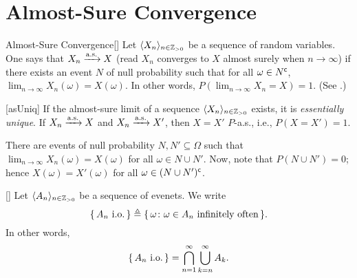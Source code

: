 \documentclass[../probability.tex]{subfiles}
\begin{document}
\section{Almost-Sure Convergence}

\begin{Definition}{Almost-Sure Convergence}[]
    Let \(\lang X_n \rang_{n \in \ZZ_{>0}}\) be a
    sequence of random variables.
    One says that \(X_n \xrightarrow{\mathrm{a.s.}} X\)
    (read \(X_n\) converges to \(X\) almost surely when \(n \to \infty\))
    if there exists an event \(N\) of null probability
    such that for all \(\omega \in N^{\mathsf{c}}\),
    \(\lim_{n \to \infty} X_n(\omega) = X(\omega)\).
    In other words, \(P \left( \lim_{n \to \infty} X_n = X \right) = 1\). (See .)
\end{Definition}

\begin{Lemma}{}[asUniq]
    If the almost-sure limit of a sequence \(\lang X_n \rang_{n \in \ZZ_{>0}}\)
    exists, it is \emph{essentially unique}.
    If \(X_n \xrightarrow{\mathrm{a.s.}} X\) and \(X_n \xrightarrow{\mathrm{a.s.}} X'\), then \(X = X'\) \(P\)-a.s., i.e., \(P(X = X') = 1\).
\end{Lemma}
\begin{myproof}[Proof]
    There are events of null probability \(N, N' \subseteq \Omega\)
    such that \(\lim_{n \to \infty} X_n(\omega) = X(\omega)\)
    for all \(\omega \in N \cup N'\).
    Now, note that \(P(N \cup N') = 0\);
    hence \(X(\omega) = X'(\omega)\) for all \(\omega \in (N \cup N')^{\mathsf{c}}\).
\end{myproof}

\begin{note}
\end{note}

\begin{Notation}{}[]
    Let \(\lang A_n \rang_{n \in \ZZ_{>0}}\) be a sequence of evenets.
    We write
    \[
        \{\,A_n\text{ i.o.}\,\} \triangleq \{\,\omega \colon \omega \in A_n\text{ infinitely
        often}\,\}\text.
    \]
    In other words,
    \[
        \{\,A_n\text{ i.o.}\,\} = \bigcap_{n=1}^\infty \bigcup_{k=n}^\infty A_k\text.
    \]
\end{Notation}
\end{document}
